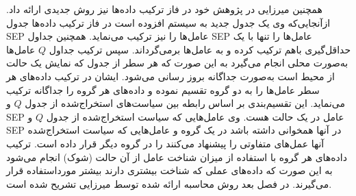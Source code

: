  همچنین میرزایی در پژوهش خود در فاز ترکیب داده‌ها نیز روش جدیدی ارائه داد. ازآنجایی‌که وی یک جدول جدید به سیستم افزوده است در فاز ترکیب داده‌ها جدول SEP عامل‌ها را نیز ترکیب می‌نماید. همچنین جداول SEP عامل‌ها را تنها با یک حداقل‌گیری باهم ترکیب کرده و به عامل‌ها برمی‌گرداند. سپس ترکیب جداول $Q$ عامل‌ها به‌صورت محلی انجام می‌گیرد به این صورت که هر سطر از جدول که نمایش یک حالت از محیط است به‌صورت جداگانه بروز رسانی می‌شود. ایشان در ترکیب داده‌های هر سطر عامل‌ها را به دو گروه تقسیم نموده و داده‌های هر گروه را جداگانه ترکیب می‌نماید. این تقسیم‌بندی بر اساس رابطه بین سیاست‌های استخراج‌شده از جدول $Q$ و SEP عامل در یک حالت هست. وی عامل‌هایی که سیاست استخراج‌شده از جدول $Q$ و SEP در آنها همخوانی داشته باشد در یک گروه و عامل‌هایی که سیاست استخراج‌شده آنها عمل‌های متفاوتی را پیشنهاد می‌کنند را در گروه دیگر قرار داده است. ترکیب داده‌های هر گروه با استفاده از میزان شناخت عامل از آن حالت (شوک) انجام می‌شود به این صورت که داده‌های عملی که شناخت بیشتری دارند بیشتر مورداستفاده قرار می‌گیرند. در فصل بعد روش محاسبه ارائه شده توسط میرزایی تشریح شده است.